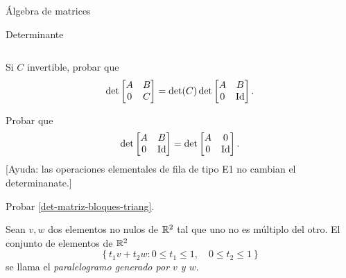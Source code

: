 \begin{chapter}{\'Algebra de matrices}
\begin{section}{Determinante}
\begin{enumex}
\begin{enumex}
$$        $$ 
        \item Si $C$ invertible, probar que
        $$
        \det \begin{bmatrix} A &B \\ 0 & C \end{bmatrix} = \det(C)  \det \begin{bmatrix} A  &B \\ 0 & \operatorname{Id} \end{bmatrix}.
        $$ 
        \item Probar que 
        $$\det\begin{bmatrix} A  &B \\ 0 & \operatorname{Id} \end{bmatrix}= \det\begin{bmatrix} A  &0 \\ 0 & \operatorname{Id} \end{bmatrix}.$$
        [Ayuda: las operaciones elementales de fila de tipo E1 no cambian el determinanate.]
        \item Probar \eqref{det-matriz-bloques-triang}. 
    \end{enumex}

        
    \item\label{ejercicio-area-de un paralelogramo} Sean $v,w$ dos elementos no nulos de $\mathbb R^2$ tal que uno no es múltiplo del otro. El conjunto de elementos de $\mathbb R^2$ 
    $$
    \left\{ t_1 v + t_2 w: 0 \le t_1 \le 1, \quad 0 \le t_2 \le 1 \right\}
    $$
    se llama el \textit{paralelogramo generado por $v$ y $w$}. 
    

\end{enumex}
\end{section}
\end{chapter}
